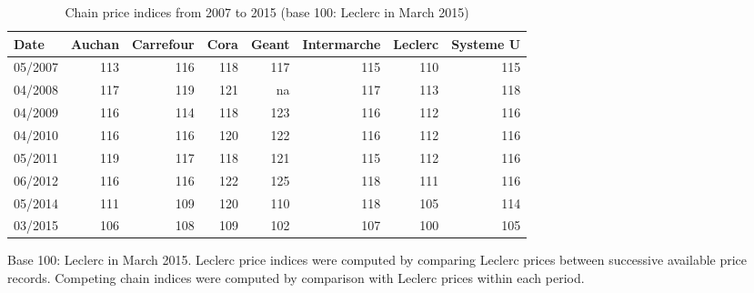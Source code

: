 \documentclass[english]{article}
\begin{document}
\begin{table}[htbp]
\caption{Chain price indices from 2007 to 2015 (base 100: Leclerc in March 2015)}
\label{tab:qlmc_comparison_history}
\begin{threeparttable}
\begin{tabular}{lrrrrrrr}
    \toprule
    \toprule
    Date & Auchan & Carrefour & Cora  & Geant & Intermarche & Leclerc & Systeme U \\
    \midrule
    05/2007 & 113   & 116   & 118   & 117   & 115   & 110   & 115 \\
    04/2008 & 117   & 119   & 121   & na    & 117   & 113   & 118 \\
    04/2009 & 116   & 114   & 118   & 123   & 116   & 112   & 116 \\
    04/2010 & 116   & 116   & 120   & 122   & 116   & 112   & 116 \\
    05/2011 & 119   & 117   & 118   & 121   & 115   & 112   & 116 \\
    06/2012 & 116   & 116   & 122   & 125   & 118   & 111   & 116 \\
    05/2014 & 111   & 109   & 120   & 110   & 118   & 105   & 114 \\
    03/2015 & 106   & 108   & 109   & 102   & 107   & 100   & 105 \\
    \bottomrule
    \bottomrule
    \end{tabular}
\begin{tablenotes}
      \small
      \item Base 100: Leclerc in March 2015. Leclerc price indices were computed by comparing Leclerc prices between successive available price records. Competing chain indices were computed by comparison with Leclerc prices within each period.
\end{tablenotes}
\end{threeparttable}
\end{table}
\end{document}
